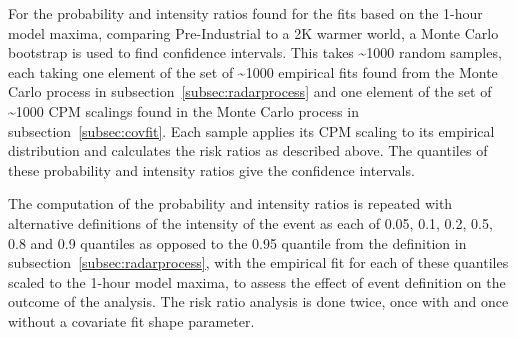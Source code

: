For the probability and intensity ratios found for the fits based on the 1-hour model maxima,
    comparing Pre-Industrial to a 2K warmer world,
    a Monte Carlo bootstrap is used to find confidence intervals.
This takes \textasciitilde1000 random samples, each taking one element of the set of \textasciitilde1000 empirical fits found from the Monte Carlo process in subsection~\ref{subsec:radarprocess}
    and one element of the set of \textasciitilde1000 CPM scalings found in the Monte Carlo process in subsection~\ref{subsec:covfit}.
Each sample applies its CPM scaling to its empirical distribution and calculates the risk ratios as described above.
The quantiles of these probability and intensity ratios give the confidence intervals.

The computation of the probability and intensity ratios is repeated with alternative definitions of the intensity of the event
    as each of 0.05, 0.1, 0.2, 0.5, 0.8 and 0.9 quantiles as opposed to the 0.95 quantile from the definition in subsection~\ref{subsec:radarprocess},
    with the empirical fit for each of these quantiles scaled to the 1-hour model maxima,
    to assess the effect of event definition on the outcome of the analysis.
The risk ratio analysis is done twice, once with and once without a covariate fit shape parameter.